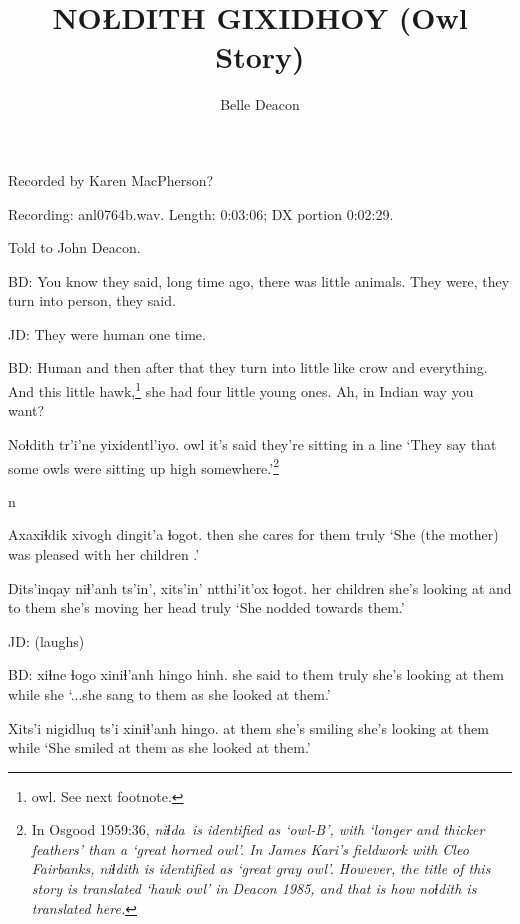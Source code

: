 \documentclass[12pt]{article}
\begin{document}
\title{NOŁDITH GIXIDHOY \newline (Owl Story)}
\author{Belle Deacon}
\date{}

\maketitle

Recorded by Karen MacPherson?  

Recording: anl0764b.wav. Length: 0:03:06; DX portion 0:02:29.

Told to John Deacon.

\bigskip 

BD: You know they said, long time ago, there was little
animals. They were, they turn into person, they said.

JD:  They were human one time.

BD: Human and then after that they turn into little like crow and
everything. And this little hawk,\footnote{owl. See next footnote.} she had four little young ones. Ah,
in Indian way you want?

\gll Noɬdith        tr'i'ne   yixidentl'iyo.
owl {it's said} {they're sitting in a line}
\glt `They say that some owls were sitting up high somewhere.'\footnote{In Osgood 1959:36,
\em niɬda\texttheta\ \em is identified as `owl-B', with
`longer and thicker feathers' than a `great horned owl'. In James Kari's
fieldwork with Cleo Fairbanks, \em niɬdith \em is
identified as `great gray owl'. However, the title of this story is translated
`hawk owl' in Deacon 1985, and that is how \em noɬdith \em is translated
here.}  
\glend

n

\gll Axaxiɬdik {xivogh dingit'a}           ɬogot. 
then      {she cares for them} truly
\glt `She (the mother) was pleased with her children .'
\glend

\gll Dits'inqay   niɬ'anh          ts'in', xits'in' ntthi'it'ox      ɬogot. 
{her children} {she's looking at} and    {to them}  {she's moving her head} truly
\glt `She nodded towards them.'
\glend

JD:  (laughs)

BD:  
 xiɬne ɬogo  xiniɬ'anh hingo hinh.
{                  }   {she said to them} truly {she's looking at them} while she
\glt `...she sang to them as she looked at them.'
\glend

\gll Xits'i  nigidluq ts'i xiniɬ'anh             hingo.
{at them} {she's smiling} {}  {she's looking at them} while
\glt `She smiled at them as she looked at them.'
\glend
\end{document}
